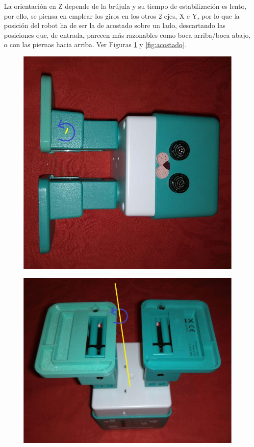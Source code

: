 La orientación en Z depende de la brújula y su tiempo de estabilización es lento, por ello, se piensa en emplear los giros en los otros 2 ejes, X e Y, por lo que la posición del robot ha de ser la de acostado sobre un lado, descartando las posiciones que, de entrada, parecen más razonables como boca arriba/boca abajo, o con las piernas hacia arriba. Ver Figuras \ref{fig:patas_arriba} y \ref{fig:acostado}.

\begin{figure}
\centering
\begin{minipage}{.5\textwidth}
  \centering
  \includegraphics[width=.9\textwidth]{Figures/acostado}
  \label{fig:acostado}
\end{minipage}%
\begin{minipage}{.5\textwidth}
  \centering
  \includegraphics[width=.9\textwidth]{Figures/patas_arriba}
  \label{fig:patas_arriba}
\end{minipage}
\end{figure}



